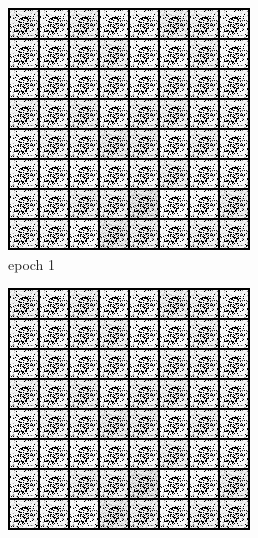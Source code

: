 \documentclass[a4paper]{article}
\theoremstyle{definition}
\newenvironment{soln}{
	\leavevmode\color{blue}\ignorespaces
}{}
\begin{document}
\begin{enumerate} [label=(\alph*)]
\begin{soln}
		\begin{figure}[H]
			\centering
			\begin{subfigure}[b]{0.3\textwidth}
				\centering
				\includegraphics[width=\textwidth]{images/q1b_gen_img1.png}
				\caption{epoch 1}
			\end{subfigure}
			\hfill
			\begin{subfigure}[b]{0.3\textwidth}
				\centering
				\includegraphics[width=\textwidth]{images/q1b_gen_img50.png}

\end{subfigure}
\end{figure}
\end{soln}
\end{enumerate}
\end{document}
